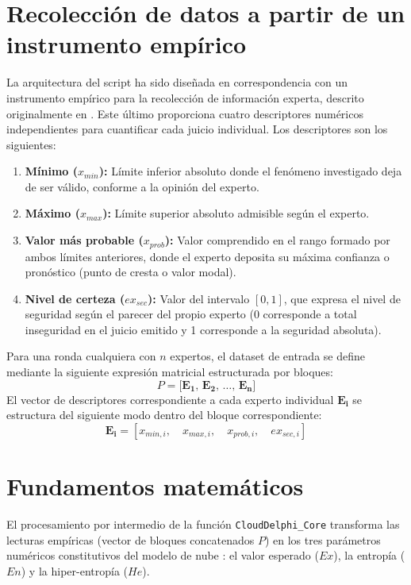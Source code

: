\documentclass[11pt,a4paper]{article}
\begin{document}
\section{Recolección de datos a partir de un instrumento empírico}
La arquitectura del script ha sido diseñada en correspondencia con un instrumento empírico para la recolección de información experta, descrito originalmente en \cite{cruz2021}. Este último proporciona cuatro descriptores numéricos independientes para cuantificar cada juicio individual. Los descriptores son los siguientes:
\begin{enumerate}
    \item \textbf{Mínimo ($x_{min}$):} Límite inferior absoluto donde el fenómeno investigado deja de ser válido, conforme a la opinión del experto.
    \item \textbf{Máximo ($x_{max}$):} Límite superior absoluto admisible según el experto.
    \item \textbf{Valor más probable ($x_{prob}$):} Valor comprendido en el rango formado por ambos límites anteriores, donde el experto deposita su máxima confianza o pronóstico (punto de cresta o valor modal).
    \item \textbf{Nivel de certeza ($ex_{sec}$):} Valor del intervalo $[0, 1]$, que expresa el nivel de seguridad según el parecer del propio experto (0 corresponde a total inseguridad en el juicio emitido y 1 corresponde a la seguridad absoluta).
\end{enumerate}

Para una ronda cualquiera con $n$ expertos, el dataset de entrada se define mediante la siguiente expresión matricial estructurada por bloques:
\begin{equation}
    P = \Big[ \mathbf{E_1}, \, \mathbf{E_2}, \, \dots, \, \mathbf{E_n} \Big]
\end{equation}
El vector de descriptores correspondiente a cada experto individual $\mathbf{E_i}$ se estructura del siguiente modo dentro del bloque correspondiente:
\begin{equation}
    \mathbf{E_i} = \left[ x_{min,i}, \quad x_{max,i}, \quad x_{prob,i}, \quad ex_{sec,i} \right]
\end{equation}

\section{Fundamentos matemáticos}
El procesamiento por intermedio de la función \texttt{CloudDelphi\_Core} transforma las lecturas empíricas (vector de bloques concatenados $P$) en los tres parámetros numéricos constitutivos del modelo de nube \cite{li1995}: el valor esperado ($Ex$), la entropía ($En$) y la hiper-entropía ($He$).
\end{document}
